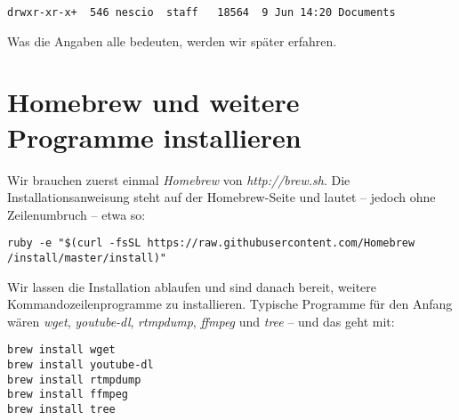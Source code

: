 \begin{verbatim}
drwxr-xr-x+  546 nescio  staff   18564  9 Jun 14:20 Documents
\end{verbatim}

\noindent Was die Angaben alle bedeuten, werden wir später erfahren.

\section{Homebrew und weitere Programme installieren}

Wir brauchen  zuerst einmal \emph{Homebrew} von \emph{http://brew.sh}. Die Installationsanweisung steht auf der Homebrew-Seite und lautet – jedoch ohne Zeilenumbruch – etwa so:

\begin{verbatim}
ruby -e "$(curl -fsSL https://raw.githubusercontent.com/Homebrew
/install/master/install)"
\end{verbatim}

\noindent Wir lassen die Installation ablaufen und sind danach bereit, weitere Kommandozeilenprogramme zu installieren. 
Typische Programme für den Anfang wären \emph{wget}, \emph{youtube-dl}, \emph{rtmpdump}, \emph{ffmpeg} und \emph{tree} – und das geht mit:

\begin{verbatim}
brew install wget
brew install youtube-dl
brew install rtmpdump
brew install ffmpeg
brew install tree
\end{verbatim}

